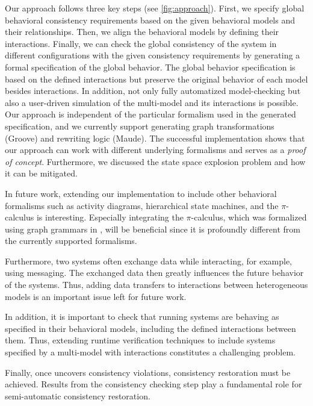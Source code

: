 \documentclass{jot}
\begin{document}
Our approach follows three key steps (see \cref{fig:approach}).
First, we specify global behavioral consistency requirements based on the given behavioral models and their relationships. 
Then, we align the behavioral models by defining their interactions.
Finally, we can check the global consistency of the system in different configurations with the given consistency requirements by generating a formal specification of the global behavior.
The global behavior specification is based on the defined interactions but preserve the original behavior of each model besides interactions.
In addition, not only fully automatized model-checking but also a user-driven simulation of the multi-model and its interactions is possible.
Our approach is independent of the particular formalism used in the generated specification, and we currently support generating graph transformations (Groove) and rewriting logic (Maude).
The successful implementation shows that our approach can work with different underlying formalisms and serves as a \textit{proof of concept}.
Furthermore, we discussed the state space explosion problem and how it can be mitigated.

In future work, extending our implementation to include other behavioral formalisms such as activity diagrams, hierarchical state machines, and the $\pi$-calculus is interesting.
Especially integrating the $\pi$-calculus, which was formalized using graph grammars in \cite{gadducciGraphRewritingPcalculus2007}, will be beneficial since it is profoundly different from the currently supported formalisms.

Furthermore, two systems often exchange data while interacting, for example, using messaging.
The exchanged data then greatly influences the future behavior of the systems.
Thus, adding data transfers to interactions between heterogeneous models is an important issue left for future work.

In addition, it is important to check that running systems are behaving as specified in their behavioral models, including the defined interactions between them.
Thus, extending runtime verification techniques to include systems specified by a multi-model with interactions constitutes a challenging problem.

Finally, once  uncovers consistency violations, consistency restoration must be achieved.
Results from the consistency checking step play a fundamental role for semi-automatic consistency restoration. %
\end{document}
